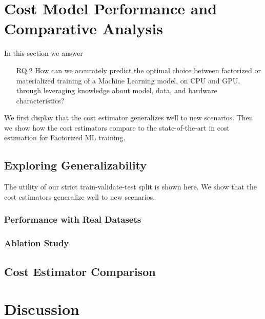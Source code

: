 \section{Cost Model Performance and Comparative Analysis}
\label{sec:eval-model-evaluation}

In this section we answer
\begin{itemize}
  \item[RQ.2] How can we accurately predict the optimal choice between factorized or materialized training of a Machine Learning model, on CPU and GPU, through leveraging knowledge about model, data, and hardware characteristics?
\end{itemize}

We first display that the cost estimator generalizes well to new scenarios. Then we show how the cost estimators compare to the state-of-the-art in cost estimation for Factorized ML training.

\subsection{Exploring Generalizability}
The utility of our strict train-validate-test split is shown here. We show that the cost estimators generalize well to new scenarios.


\subsubsection{Performance with Real Datasets}
\label{subsubsec:6-real-datasets}

\subsubsection{Ablation Study}
\label{subsubsec:6-ablation}


\subsection{Cost Estimator Comparison}


\section{Discussion}
\label{sec:eval-discussion}

